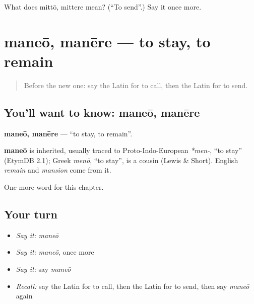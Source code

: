 \begin{tcolorbox}[breakable,colback=teal!4,colframe=teal!35!black,title={Before you move on}]
What does mittō, mittere mean? (\textquotedblleft{}To send\textquotedblright{}.) Say it once more.
\end{tcolorbox}
\section[maneō, manēre]{maneō, manēre — to stay, to remain}

\label{lesson:LA-C77-maneo}



\begin{quote}
Before the new one: say the Latin for to call, then the Latin for to send.
\end{quote}

\subsection*{You'll want to know: maneō, manēre}
\textbf{maneō, manēre} — \textquotedblleft{}to stay, to remain\textquotedblright{}.

\begin{cousinweb}
\textbf{maneō} is inherited, usually traced to Proto-Indo-European \emph{*men-}, \textquotedblleft{}to stay\textquotedblright{} (EtymDB 2.1); Greek \emph{menō}, \textquotedblleft{}to stay\textquotedblright{}, is a cousin (Lewis \& Short). English \emph{remain} and \emph{mansion} come from it.
\end{cousinweb}

\begin{grammarlens}[title={What you've built}]
One more word for this chapter.
\end{grammarlens}

\subsection*{Your turn}
\begin{itemize}
\raggedright
  \item \emph{Say it:} \emph{maneō}
  \item \emph{Say it:} \emph{maneō}, once more
  \item \emph{Say it:} say \emph{maneō}
  \item \emph{Recall:} say the Latin for to call, then the Latin for to send, then say \emph{maneō} again
\end{itemize}


